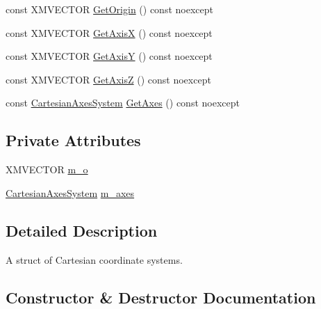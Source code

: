 \begin{DoxyCompactItemize}
\item 
const X\+M\+V\+E\+C\+T\+OR \hyperlink{structmage_1_1_cartesian_coordinate_system_add81a0efb47b0aa4084d803ba1a684e6}{Get\+Origin} () const noexcept
\item 
const X\+M\+V\+E\+C\+T\+OR \hyperlink{structmage_1_1_cartesian_coordinate_system_a00947f77f6af53596d00ee76e0486430}{Get\+AxisX} () const noexcept
\item 
const X\+M\+V\+E\+C\+T\+OR \hyperlink{structmage_1_1_cartesian_coordinate_system_a5e625320f8d7c3b0c46fe89c51d9e8ec}{Get\+AxisY} () const noexcept
\item 
const X\+M\+V\+E\+C\+T\+OR \hyperlink{structmage_1_1_cartesian_coordinate_system_a9d5c1cc1fa21ea0ac79054acfb676a24}{Get\+AxisZ} () const noexcept
\item 
const \hyperlink{structmage_1_1_cartesian_axes_system}{Cartesian\+Axes\+System} \hyperlink{structmage_1_1_cartesian_coordinate_system_ae329f2a0d4d3a4c96d745d3af10fcaad}{Get\+Axes} () const noexcept
\end{DoxyCompactItemize}
\subsection*{Private Attributes}
\begin{DoxyCompactItemize}
\item 
X\+M\+V\+E\+C\+T\+OR \hyperlink{structmage_1_1_cartesian_coordinate_system_a1ea373bb91be991ee221a2ce1e02be2b}{m\+\_\+o}
\item 
\hyperlink{structmage_1_1_cartesian_axes_system}{Cartesian\+Axes\+System} \hyperlink{structmage_1_1_cartesian_coordinate_system_acf7b8cf35026f5fa8fc11a126b96b055}{m\+\_\+axes}
\end{DoxyCompactItemize}


\subsection{Detailed Description}
A struct of Cartesian coordinate systems. 

\subsection{Constructor \& Destructor Documentation}
\hypertarget{structmage_1_1_cartesian_coordinate_system_a3f4a3309daccc818f06400a44f70b09b}{}\label{structmage_1_1_cartesian_coordinate_system_a3f4a3309daccc818f06400a44f70b09b} 
